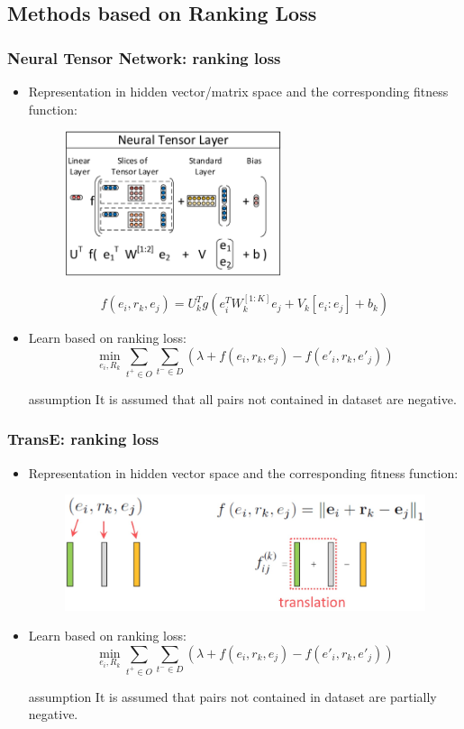 \documentclass[pdf,10pt]{beamer}
\begin{document}
\subsection{Methods based on Ranking Loss}
\begin{frame}
\frametitle{Neural Tensor Network: ranking loss}
\begin{itemize}
	\item Representation in hidden vector/matrix space and the corresponding fitness function:
		\begin{figure}
			\includegraphics[width=0.60\textwidth,height=0.30\textwidth]{7.eps}
		\end{figure}
		\begin{equation}
			f(e_i,r_k,e_j)=U_k^Tg(e_i^TW_k^{[1:K]}e_j + V_k[e_i:e_j] + b_k)
		\end{equation}
	\item Learn based on ranking loss:
		\begin{equation}
			\min_{e_i,R_k}\sum_{t^+ \in O}\sum_{t^- \in D}{(\lambda + f(e_i,r_k,e_j) - f(e'_i,r_k,e'_j))}
		\end{equation}
	\begin{exampleblock}{assumption}
		It is assumed that all pairs not contained in dataset are negative.
	\end{exampleblock}
\end{itemize}
\end{frame}

\begin{frame}
\frametitle{TransE: ranking loss}
\begin{itemize}
	\item Representation in hidden vector space and the corresponding fitness function:
		\begin{figure}
			\includegraphics[height=0.20\textwidth]{6.eps}
		\end{figure}
	\item Learn based on ranking loss:
		\begin{equation}
			\min_{e_i,R_k}\sum_{t^+ \in O}\sum_{t^- \in D}{(\lambda + f(e_i,r_k,e_j) - f(e'_i,r_k,e'_j))}
		\end{equation}
	\begin{exampleblock}{assumption}
		It is assumed that pairs not contained in dataset are partially negative.
	\end{exampleblock}
\end{itemize}
\end{frame}
\end{document}
